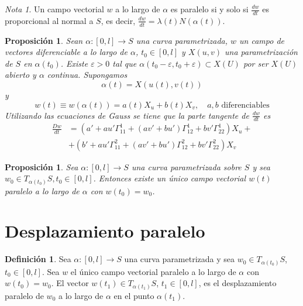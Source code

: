 \documentclass{report}
\newtheorem{proposition}[theorem]{Proposición}
\theoremstyle{remark}
\theoremstyle{remark}
\newtheorem*{note}{Nota}
\theoremstyle{definition}
\newtheorem{definition}{Definición}[chapter]
\theoremstyle{definition}
\theoremstyle{definition}
\begin{document}
\begin{note}
    Un campo vectorial $w$ a lo largo de $\alpha$ es paralelo si y solo si $\frac{dw}{dt}$ es proporcional al normal a $S$, es decir, $\frac{dw}{dt} = \lambda(t) N(\alpha(t))$.
\end{note}

\begin{proposition}
    Sean $\alpha : [0, l] \to S$ una curva parametrizada, $w$ un campo de vectores diferenciable a lo largo de $\alpha$, $t_0 \in [0, l]$ y $X(u, v)$ una parametrización de $S$ en $\alpha(t_0)$.
    Existe $\varepsilon>0$ tal que $\alpha(t_0-\varepsilon, t_0+\varepsilon) \subset X(U)$ por ser $X(U)$ abierto y $\alpha$ continua. Supongamos
    $$\alpha(t) = X(u(t), v(t))$$ y $$w(t) \equiv w(\alpha(t)) = a(t)X_u + b(t)X_v, \quad a, b \text{ diferenciables}$$
    Utilizando las ecuaciones de Gauss se tiene que la parte tangente de $\frac{dw}{dt}$ es
    \begin{align*}
        \frac{Dw}{dt} & = (a' + au'\Gamma^1_{11} + (av' + bu')\Gamma^1_{12} + bv'\Gamma^1_{22}) X_u + \\
                      & + (b' + au'\Gamma^2_{11} + (av' + bu')\Gamma^2_{12} + bv'\Gamma^2_{22}) X_v
    \end{align*}
\end{proposition}

\begin{proposition}
    Sea $\alpha : [0, l] \to S$ una curva parametrizada sobre $S$ y sea $w_0 \in T_{\alpha(t_0)}S, t_0 \in [0, l]$.
    Entonces existe un único campo vectorial $w(t)$ paralelo a lo largo de $\alpha$ con $w(t_0) = w_0$.
\end{proposition}

\section{Desplazamiento paralelo}

\begin{definition}
    Sea $\alpha : [0, l] \to S$ una curva parametrizada y sea $w_0 \in T_{\alpha(t_0)}S$, $t_0 \in [0, l]$.
    Sea $w$ el único campo vectorial paralelo a lo largo de $\alpha$ con $w(t_0) = w_0$.
    El vector $w(t_1) \in T_{\alpha(t_1)}S$, $t_1 \in [0, l]$, es el desplazamiento paralelo de $w_0$ a lo largo de $\alpha$ en el punto $\alpha(t_1)$.
\end{definition}
\end{document}
